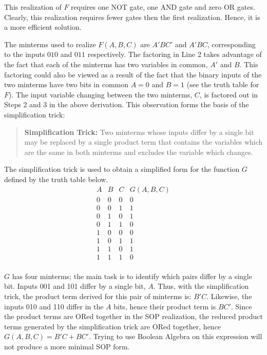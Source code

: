 This realization of $F$ requires one NOT gate, one AND gate and 
zero OR gates.  Clearly, this realization requires fewer gates then the
first realization.  Hence, it is a more efficient solution.

The minterms used to realize $F(A,B,C)$ are $A'BC'$ and $A'BC$, corresponding 
to the inputs $010$ and $011$ respectively.  The factoring in Line
2 takes advantage of the fact that each of the minterms has two 
variables in common, $A'$ and $B$. This factoring could also be viewed
as a result of the fact that the binary inputs 
of the two minterms have two bits in common $A=0$ and $B=1$ (see 
the truth table for $F$).  The input variable changing between 
the two minterms, $C$, is factored out in Steps 2 and 3 in the above
derivation.  This observation forms the basis of the simplification trick: 


\begin{quote}
\textbf{Simplification Trick:} Two minterms whose inputs differ by a single bit 
may be replaced by
a single product term that contains the variables which are the same in 
both minterms and excludes the variable which changes.  
\end{quote}


The simplification trick is used to obtain a simplified form 
for the function $G$ defined by the truth table below.
$$\begin{array}{c|c|c||c}
A & B & C & G(A,B,C)  \\ \hline
0 & 0 & 0 & 0 \\ \hline
0 & 0 & 1 & 1 \\ \hline
0 & 1 & 0 & 1 \\ \hline
0 & 1 & 1 & 0 \\ \hline
1 & 0 & 0 & 0 \\ \hline
1 & 0 & 1 & 1 \\ \hline
1 & 1 & 0 & 1 \\ \hline
1 & 1 & 1 & 0 \\
\end{array} $$


$G$ has four minterms; the main task is to identify which
pairs differ by a single bit.  Inputs 001 and 101 differ by 
a single bit, $A$.  Thus, with the simplification trick,
the product term derived for this pair of minterms is: $B'C$.  
Likewise, the inputs 010 and 110 differ in the $A$ bits, hence
their product term is $BC'$.  Since the product terms are
ORed together in the SOP realization, the reduced product
terms generated by the simplification trick are ORed together,
hence $G(A,B,C)=B'C+BC'$.  Trying to use Boolean Algebra on 
this expression will not produce a more minimal SOP form.

